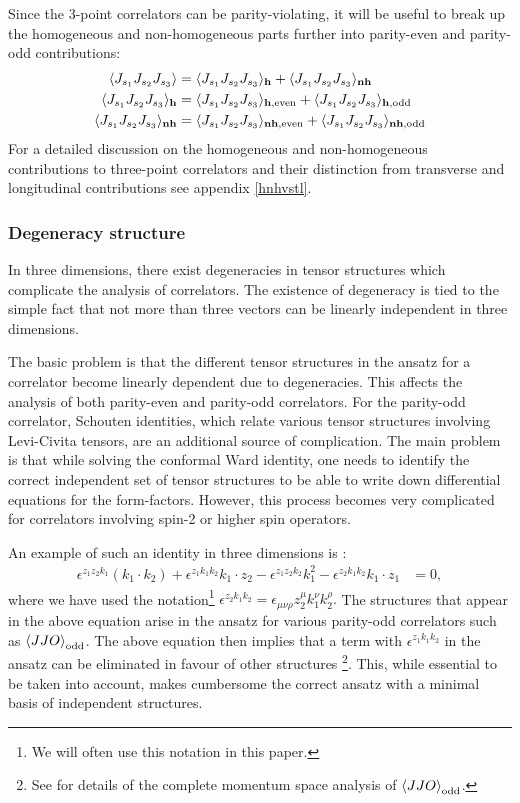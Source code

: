 \documentclass[a4paper,11pt]{article}
\begin{document}
Since the 3-point correlators can be parity-violating, it will be useful to break up the homogeneous and non-homogeneous parts further into parity-even and parity-odd contributions:
 \begin{align}\label{jssph1}
    \langle J_{s_1} J_{s_2} J_{s_3} \rangle &= \langle J_{s_1} J_{s_2} J_{s_3} \rangle_{\bf{h}}+ \langle J_{s_1} J_{s_2} J_{s_3} \rangle_{\bf{nh}}\nonumber\\
    \langle J_{s_1} J_{s_2} J_{s_3} \rangle_{\bf{h}} &= \langle J_{s_1} J_{s_2} J_{s_3} \rangle_{\bf{h},\text{even}}+\langle J_{s_1} J_{s_2} J_{s_3} \rangle_{\bf{h},\text{odd}}\nonumber\\
     \langle J_{s_1} J_{s_2} J_{s_3} \rangle_{\bf{nh}} &= \langle J_{s_1} J_{s_2} J_{s_3} \rangle_{\bf{nh},\text{even}}+\langle J_{s_1} J_{s_2} J_{s_3} \rangle_{\bf{nh},\text{odd}}
\end{align}
 For a detailed discussion on the homogeneous and non-homogeneous contributions to three-point correlators and their distinction from transverse and longitudinal contributions see appendix \ref{hnhvstl}.
\subsubsection{Degeneracy structure}
\label{sectiondeg}
In three dimensions, there exist degeneracies in tensor structures which complicate the analysis of correlators. The existence of degeneracy is tied to the simple fact that not more than three vectors can be linearly independent in three dimensions.

The basic problem is that the different tensor structures in the ansatz for a correlator become linearly dependent due to degeneracies. This affects the analysis of both parity-even and parity-odd correlators. For the parity-odd correlator, Schouten identities, which relate various tensor structures involving Levi-Civita tensors, are an additional source of complication. The main problem is that while solving the conformal Ward identity, one needs to identify the correct independent set of tensor structures to be able to write down differential equations for the form-factors. However, this process becomes very complicated for correlators involving spin-2 or higher spin operators.

An example of such an identity in three dimensions is :
\begin{align}\label{jjoS1}
\epsilon^{z_1 z_2 k_1}(k_1\cdot k_2)+\epsilon^{z_1 k_1 k_2}k_1\cdot z_2-\epsilon^{z_1 z_2 k_2}k_1^2-\epsilon^{z_2 k_1 k_2}k_1\cdot z_1 &=0,
\end{align}
where we have used the notation\footnote{We will often use this notation in this paper.} $\epsilon^{z_2 k_1 k_2}=\epsilon_{\mu\nu\rho}z_2^{\mu} k_1^{\nu} k_2^{\rho}.$
The structures that appear in the above equation arise in the ansatz for various parity-odd correlators such as $\ev{JJO}_{\text{odd}}$. The above equation then implies that a term with $\epsilon^{z_1 k_1 k_2}$ in the ansatz can be eliminated in favour of other structures \footnote{See \cite{Jain:2021wyn} for details of the complete momentum space analysis of $\ev{JJO}_{\text{odd}}$.}. This, while essential to be taken into account, makes cumbersome the correct ansatz with a minimal basis of independent structures.
\end{document}
